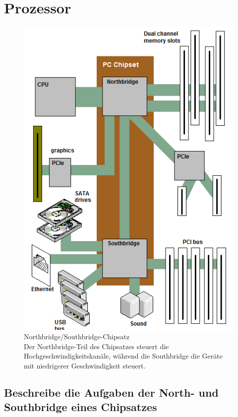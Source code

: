 \documentclass[a4paper]{article}
\begin{document}
    \section{Prozessor}\label{sec:prozessor}
    \begin{figure}
        \centering
        \includegraphics[scale=.2]{media/sb-nb}
        \captionsetup{labelformat=empty}
        \caption{Northbridge/Southbridge-Chipsatz\\\color{red}\small{Der Northbridge-Teil des Chipsatzes steuert die Hochgeschwindigkeitskanäle, während die Southbridge die Geräte mit niedrigerer Geschwindigkeit steuert.}}
        \label{fig:bridges}
    \end{figure}

    \subsection{\color{red}Beschreibe die Aufgaben der North- und Southbridge eines Chipsatzes}\label{subsec:beschreibe-die-aufgaben-der-north--und-southbridge-eines-chipsatzes}
\end{document}

